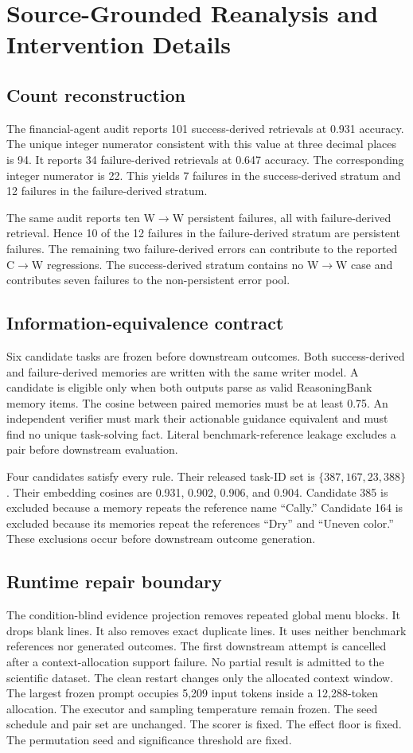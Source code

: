 \section{Source-Grounded Reanalysis and Intervention Details}
\subsection{Count reconstruction}
The financial-agent audit reports 101 success-derived retrievals at 0.931 accuracy. The unique integer numerator consistent with this value at three decimal places is 94. It reports 34 failure-derived retrievals at 0.647 accuracy. The corresponding integer numerator is 22. This yields 7 failures in the success-derived stratum and 12 failures in the failure-derived stratum.

The same audit reports ten W$\rightarrow$W persistent failures, all with failure-derived retrieval. Hence 10 of the 12 failures in the failure-derived stratum are persistent failures. The remaining two failure-derived errors can contribute to the reported C$\rightarrow$W regressions. The success-derived stratum contains no W$\rightarrow$W case and contributes seven failures to the non-persistent error pool.

\subsection{Information-equivalence contract}
Six candidate tasks are frozen before downstream outcomes. Both success-derived and failure-derived memories are written with the same writer model. A candidate is eligible only when both outputs parse as valid ReasoningBank memory items. The cosine between paired memories must be at least 0.75. An independent verifier must mark their actionable guidance equivalent and must find no unique task-solving fact. Literal benchmark-reference leakage excludes a pair before downstream evaluation.

Four candidates satisfy every rule. Their released task-ID set is $\{387,167,23,388\}$. Their embedding cosines are 0.931, 0.902, 0.906, and 0.904. Candidate 385 is excluded because a memory repeats the reference name ``Cally.'' Candidate 164 is excluded because its memories repeat the references ``Dry'' and ``Uneven color.'' These exclusions occur before downstream outcome generation.

\subsection{Runtime repair boundary}
The condition-blind evidence projection removes repeated global menu blocks. It drops blank lines. It also removes exact duplicate lines. It uses neither benchmark references nor generated outcomes. The first downstream attempt is cancelled after a context-allocation support failure. No partial result is admitted to the scientific dataset. The clean restart changes only the allocated context window. The largest frozen prompt occupies 5,209 input tokens inside a 12,288-token allocation. The executor and sampling temperature remain frozen. The seed schedule and pair set are unchanged. The scorer is fixed. The effect floor is fixed. The permutation seed and significance threshold are fixed.

